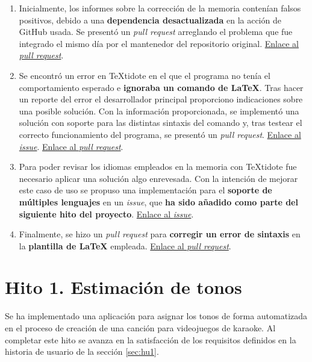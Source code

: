 \begin{enumerate}
	\item{Inicialmente, los informes sobre la corrección de la memoria contenían falsos positivos, debido a una \textbf{dependencia desactualizada} en la acción de GitHub usada. Se presentó un \textit{pull request} arreglando el problema que fue integrado el mismo día por el mantenedor del repositorio original. \href{https://github.com/ChiefGokhlayeh/textidote-action/pull/33}{Enlace al \textit{pull request}}.}
	
	\item{Se encontró un error en TeXtidote en el que el programa no tenía el comportamiento esperado e \textbf{ignoraba un comando de LaTeX}. Tras hacer un reporte del error el desarrollador principal proporciono indicaciones sobre una posible solución. Con la información proporcionada, se implementó una solución con soporte para las distintas sintaxis del comando y, tras testear el correcto funcionamiento del programa, se presentó un \textit{pull request}. \href{https://github.com/sylvainhalle/textidote/issues/208}{Enlace al \textit{issue}}. \href{https://github.com/sylvainhalle/textidote/pull/209}{Enlace al \textit{pull request}}.}
	
	\item{Para poder revisar los idiomas empleados en la memoria con TeXtidote fue necesario aplicar una solución algo enrevesada. Con la intención de mejorar este caso de uso se propuso una implementación para el \textbf{soporte de múltiples lenguajes} en un \textit{issue}, que \textbf{ha sido añadido como parte del siguiente hito del proyecto}. \href{https://github.com/sylvainhalle/textidote/issues/203}{Enlace al \textit{issue}}.}
	
	\item{Finalmente, se hizo un \textit{pull request} para \textbf{corregir un error de sintaxis} en la \textbf{plantilla de LaTeX} empleada. \href{https://github.com/JJ/plantilla-TFG-ETSIIT/pull/7}{Enlace al \textit{pull request}}.}
\end{enumerate}

\section{Hito 1. Estimación de tonos}

Se ha implementado una aplicación para asignar los tonos de forma automatizada en el proceso de creación de una canción para videojuegos de karaoke. Al completar este hito se avanza en la satisfacción de los requisitos definidos en la historia de usuario de la sección \ref{sec:hu1}.


